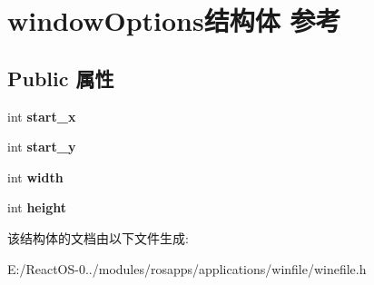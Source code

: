 \hypertarget{structwindow_options}{}\section{window\+Options结构体 参考}
\label{structwindow_options}
\subsection*{Public 属性}
\begin{DoxyCompactItemize}
\item 
\mbox{\label{structwindow_options_a19d2fd61378cb1be84a16969d17625c5}} 
int {\bfseries start\+\_\+x}
\item 
\mbox{\label{structwindow_options_ac48994eea49c52aa7cf38ed23ba9ecd5}} 
int {\bfseries start\+\_\+y}
\item 
\mbox{\label{structwindow_options_ae8e0d29dce587048df5aa851218d1838}} 
int {\bfseries width}
\item 
\mbox{\label{structwindow_options_aeb71af2bfb65b0dc045b78fe7a1b88bf}} 
int {\bfseries height}
\end{DoxyCompactItemize}


该结构体的文档由以下文件生成\+:\begin{DoxyCompactItemize}
\item 
E\+:/\+React\+O\+S-\/0../modules/rosapps/applications/winfile/winefile.\+h\end{DoxyCompactItemize}

